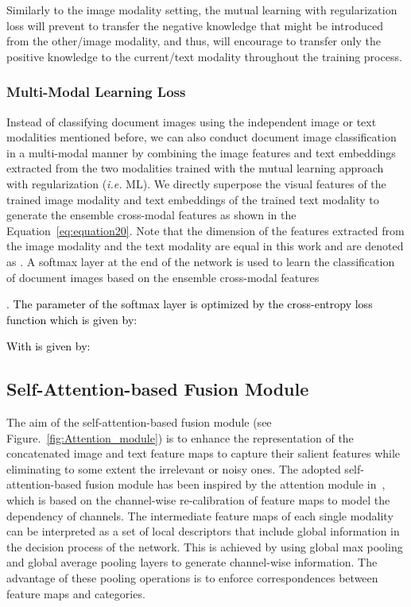 \documentclass[twocolumn]{svjour3}
\newcommand{\ie}{\textit{i.e. }}
\begin{document}
 
Similarly to the image modality setting, the mutual learning with regularization  loss will prevent to transfer the negative knowledge that might be introduced from the other/image modality, and thus, will encourage to transfer only the positive knowledge to the current/text modality throughout the training process.

\subsubsection{Multi-Modal Learning Loss}
\label{sec:multi-modal feature learning}

Instead of classifying document images using the independent image or text modalities mentioned before, we can also conduct document image classification in a multi-modal manner by combining the image features and text embeddings extracted from the two modalities trained with the mutual learning approach with regularization (\ie ML).
We directly superpose the visual features of the trained image modality and text embeddings of the trained text modality to generate the ensemble cross-modal features as shown in the Equation~\ref{eq:equation20}.
Note that the dimension of the features extracted from the image modality and the text modality are equal in this work and are denoted as . A softmax layer at the end of the network is used to learn the classification of document images based on the ensemble cross-modal features \textcolor{black}{. The parameter  of the softmax layer is optimized by the cross-entropy loss function  which is given by:

 }
 \textcolor{black}{With  is given by:}
\textcolor{black}{
 
}


\subsection{Self-Attention-based Fusion Module}

The aim of the self-attention-based fusion module (see Figure.~\ref{fig:Attention_module}) is to enhance the representation of the concatenated image and text feature maps to capture their salient features while eliminating to some extent the irrelevant or noisy ones. The adopted self-attention-based fusion module has been inspired by the attention module in~\cite{vaswani2017attention, Hu_2018_CVPR}, which is based on the channel-wise re-calibration of feature maps to model the dependency of channels. The intermediate feature maps of each single modality can be interpreted as a set of local descriptors that include global information in the decision process of the network. This is achieved by using global max pooling and global average pooling layers to generate channel-wise information. The advantage of these pooling operations is to enforce correspondences between feature maps and categories. 
\end{document}
